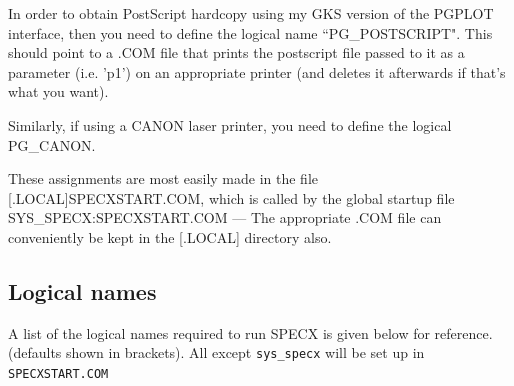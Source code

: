 \documentclass[11pt,twoside]{report}
\begin{document}
In order to obtain PostScript hardcopy using my GKS version of
the PGPLOT interface, then you need to define the logical name
``PG\_POSTSCRIPT".
This should point to a .COM file that prints the postscript file
passed to it as a parameter (i.e. 'p1') on an appropriate printer
(and deletes it afterwards if that's what you want).

Similarly, if using a CANON laser printer, you need to define the
logical PG\_CANON.

These assignments are most easily made in the file
[.LOCAL]SPECXSTART.COM, which is called by the global
startup file SYS\_SPECX:SPECXSTART.COM  --- The appropriate .COM
file can conveniently be kept in the [.LOCAL] directory also.

\subsection{Logical names}

A list of the logical names required to run SPECX is given below for reference.
(defaults shown in brackets). All except \verb+sys_specx+ will be set up in
\verb+SPECXSTART.COM+
\end{document}
